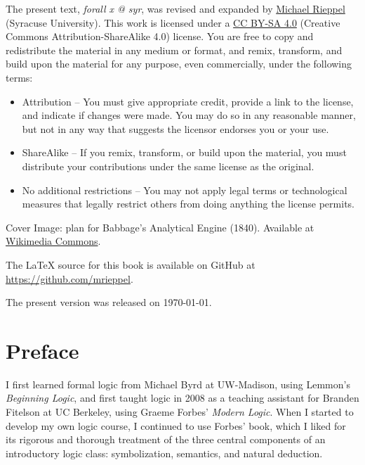 \vspace{1ex}

\noindent The present text, \emph{forall x @ syr}, was revised and expanded by \href{https://mrieppel.net/}{Michael Rieppel} (Syracuse University).  This work is licensed under a \href{https://creativecommons.org/licenses/by-sa/4.0/}{CC BY-SA 4.0} (Creative Commons Attribution-ShareAlike 4.0) license.  You are free to copy and redistribute the material in any medium or format, and  remix, transform, and build upon the material for any purpose, even commercially, under the following terms:
\begin{itemize}
\item Attribution -- You must give appropriate credit, provide a link to the license, and indicate if changes were made. You may do so in any reasonable manner, but not in any way that suggests the licensor endorses you or your use.

\item ShareAlike -- If you remix, transform, or build upon the material, you must distribute your contributions under the same license as the original.

\item No additional restrictions -- You may not apply legal terms or technological measures that legally restrict others from doing anything the license permits.
\end{itemize}

\vspace{1ex}
\noindent Cover Image: plan for Babbage's Analytical Engine (1840). Available at \href{https://commons.wikimedia.org/wiki/File:Babbage_Analytical_Engine_Plan_1840_CHM.agr.jpg}{Wikimedia Commons}.

\vspace{1ex}

\noindent The \LaTeX{} source for this book is available on GitHub at \href{https://github.com/mrieppel}{https://github.com/mrieppel}. 

\vspace{1ex}

\noindent The present version was released on \today.


\newpage
\normalsize
\chapter*{Preface}

I first learned formal logic from Michael Byrd at UW-Madison, using Lemmon's  \emph{Beginning Logic}, and first taught logic in 2008 as a teaching assistant for Branden Fitelson at UC Berkeley, using Graeme Forbes' \emph{Modern Logic}.  When I started to develop my own logic course, I continued to use Forbes' book, which I liked for its rigorous and thorough treatment of the three central components of an introductory logic class: symbolization, semantics, and natural deduction.  

